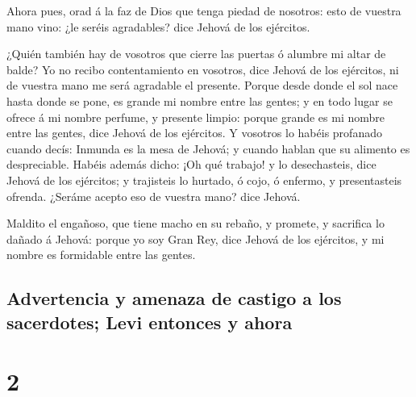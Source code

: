  Ahora pues, orad á la faz de Dios que tenga piedad de
nosotros: esto de vuestra mano vino: ¿le seréis agradables? dice Jehová
de los ejércitos.

 ¿Quién también hay de vosotros que cierre las puertas ó
alumbre mi altar de balde? Yo no recibo contentamiento en vosotros, dice
Jehová de los ejércitos, ni de vuestra mano me será agradable el
presente.  Porque desde donde el sol nace hasta donde se
pone, es grande mi nombre entre las gentes; y en todo lugar se ofrece á
mi nombre perfume, y presente limpio: porque grande es mi nombre entre
las gentes, dice Jehová de los ejércitos.  Y vosotros lo
habéis profanado cuando decís: Inmunda es la mesa de Jehová; y cuando
hablan que su alimento es despreciable.  Habéis además
dicho: ¡Oh qué trabajo! y lo desechasteis, dice Jehová de los ejércitos;
y trajisteis lo hurtado, ó cojo, ó enfermo, y presentasteis ofrenda.
¿Seráme acepto eso de vuestra mano? dice Jehová.

 Maldito el engañoso, que tiene macho en su rebaño, y
promete, y sacrifica lo dañado á Jehová: porque yo soy Gran Rey, dice
Jehová de los ejércitos, y mi nombre es formidable entre las gentes.

\hypertarget{advertencia-y-amenaza-de-castigo-a-los-sacerdotes-levi-entonces-y-ahora}{%
\subsection{Advertencia y amenaza de castigo a los sacerdotes; Levi
entonces y
ahora}\label{advertencia-y-amenaza-de-castigo-a-los-sacerdotes-levi-entonces-y-ahora}}

\hypertarget{section-39-2}{%
\section{2}\label{section-39-2}}


